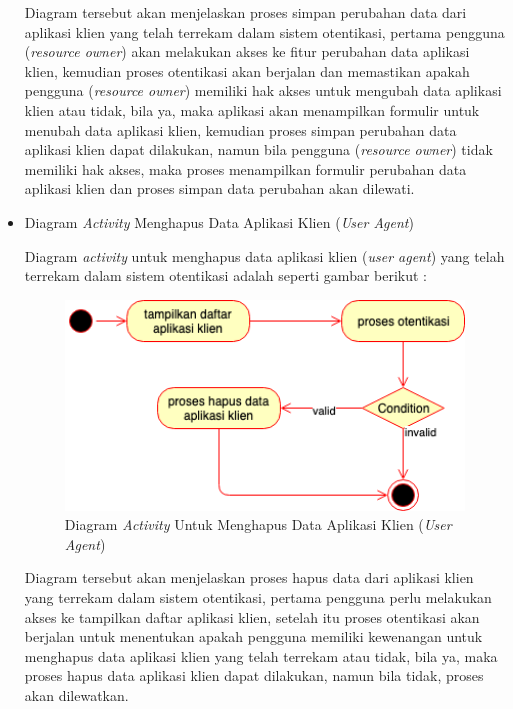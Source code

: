\documentclass[pdftex,12pt, oneside]{article}
\begin{document}
\begin{itemize}
	Diagram tersebut akan menjelaskan proses simpan perubahan data dari aplikasi klien yang telah terrekam dalam sistem otentikasi, pertama pengguna (\textit{resource owner}) akan melakukan akses ke fitur perubahan data aplikasi klien, kemudian proses otentikasi akan berjalan dan memastikan apakah pengguna (\textit{resource owner}) memiliki hak akses untuk mengubah data aplikasi klien atau tidak, bila ya, maka aplikasi akan menampilkan formulir untuk menubah data aplikasi klien, kemudian proses simpan perubahan data aplikasi klien dapat dilakukan, namun bila pengguna (\textit{resource owner}) tidak memiliki hak akses, maka proses menampilkan formulir perubahan data aplikasi klien dan proses simpan data perubahan akan dilewati.
	
	\item Diagram \textit{Activity} Menghapus Data Aplikasi Klien (\textit{User Agent})
	
	Diagram \textit{activity} untuk menghapus data aplikasi klien (\textit{user agent}) yang telah terrekam dalam sistem otentikasi adalah seperti gambar berikut :
	
	\begin{figure}[H]
		\centering
		\includegraphics[width=1\textwidth]{./resources/act-dia-remove-client}
		\caption{Diagram \textit{Activity} Untuk Menghapus Data Aplikasi Klien (\textit{User Agent})}
		\label{fig:act-dia-remove-client}
	\end{figure}
	
	Diagram tersebut akan menjelaskan proses hapus data dari aplikasi klien yang terrekam dalam sistem otentikasi, pertama pengguna perlu melakukan akses ke tampilkan daftar aplikasi klien, setelah itu proses otentikasi akan berjalan untuk menentukan apakah pengguna memiliki kewenangan untuk menghapus data aplikasi klien yang telah terrekam atau tidak, bila ya, maka proses hapus data aplikasi klien dapat dilakukan, namun bila tidak, proses akan dilewatkan.
\end{itemize}
\end{document}
